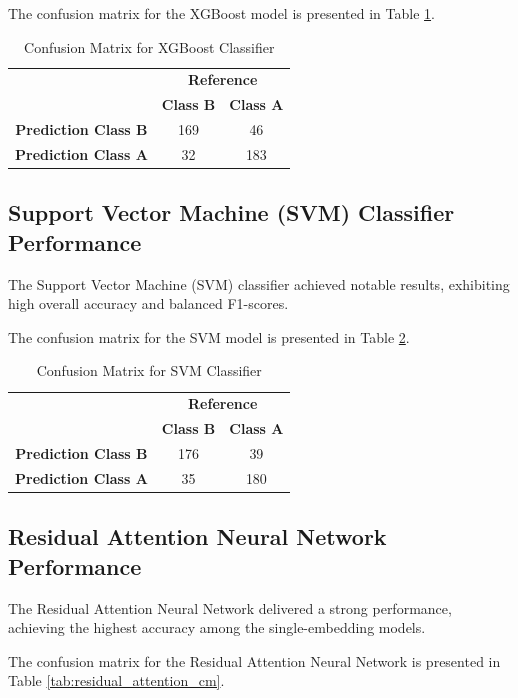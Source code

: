 \documentclass{article}
\begin{document}
The confusion matrix for the XGBoost model is presented in Table \ref{tab:xgboost_cm}.

\begin{table}[h!]
\centering
\begin{tabular}{|c|c|c|}
\hline
 & \multicolumn{2}{c|}{\textbf{Reference}} \\
\cline{2-3}
 & \textbf{Class B} & \textbf{Class A} \\
\hline
\textbf{Prediction Class B} & 169 & 46 \\
\hline
\textbf{Prediction Class A} & 32 & 183 \\
\hline
\end{tabular}
\caption{Confusion Matrix for XGBoost Classifier}
\label{tab:xgboost_cm}
\end{table}

\subsection{Support Vector Machine (SVM) Classifier Performance}
The Support Vector Machine (SVM) classifier achieved notable results, exhibiting high overall accuracy and balanced F1-scores.

The confusion matrix for the SVM model is presented in Table \ref{tab:svm_cm}.

\begin{table}[h!]
\centering
\begin{tabular}{|c|c|c|}
\hline
 & \multicolumn{2}{c|}{\textbf{Reference}} \\
\cline{2-3}
 & \textbf{Class B} & \textbf{Class A} \\
\hline
\textbf{Prediction Class B} & 176 & 39 \\
\hline
\textbf{Prediction Class A} & 35 & 180 \\
\hline
\end{tabular}
\caption{Confusion Matrix for SVM Classifier}
\label{tab:svm_cm}
\end{table}

\subsection{Residual Attention Neural Network Performance}
The Residual Attention Neural Network delivered a strong performance, achieving the highest accuracy among the single-embedding models.

The confusion matrix for the Residual Attention Neural Network is presented in Table \ref{tab:residual_attention_cm}.
\end{document}
